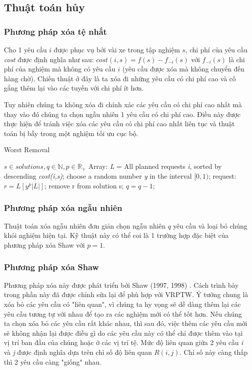 \subsection{Thuật toán hủy}

\subsubsection*{Phương pháp xóa tệ nhất}
Cho 1 yêu cầu $i$ được phục vụ bởi vài xe trong tập nghiệm $s$, chi phí của yêu cầu \textit{cost} được định nghĩa như sau: $cost(i,s)=f(s)-f_{-i}(s)$ với $f_{-i}(s)$ là chi phí của nghiệm mà không có yêu cầu $i$ (yêu cầu được xóa mà không chuyển đến hàng chờ). Chiến thuật ở đây là ta xóa đi những yêu cầu có chi phí cao và cố gắng thêm lại vào các tuyến với chi phí ít hơn.

Tuy nhiên chúng ta không xóa đi chính xác các yêu cầu có chi phí cao nhất mà thay vào đó chúng ta chọn ngẫu nhiên 1 yêu cầu có chi phí cao. Điều này được thực hiện để tránh việc xóa các yêu cầu có chi phí cao nhất liên tục và thuật toán bị bẫy trong một nghiệm tối ưu cục bộ.

\begin{algorithm}
	\label{alg:worst_removal}
	\caption{Worst Removal}
	\begin{algorithmic}[1]
		\Require $s \in {solutions}, q \in \mathbb{N}, p \in \mathbb{R}_{+}$
		\State Array: \textit{L} = All planned requests \textit{i}, sorted by descending \textit{cost(i,s)};
		\State choose a random number \textit{y} in the interval $[0, 1)$;
		\State request: $r = L\left[ y^p |L| \right]$;
		\State remove r from solution s;
		\State $q = q-1$;
		\EndWhile
	\end{algorithmic}
\end{algorithm}

\subsubsection*{Phương pháp xóa ngẫu nhiên}
Thuật toán xóa ngẫu nhiên đơn giản chọn ngẫu nhiên $q$ yêu cầu và loại bỏ chúng khỏi nghiệm hiện tại. Kỹ thuật này có thể coi là 1 trường hợp đặc biệt của phương pháp xóa Shaw với $p=1$.

\subsubsection*{Phương pháp xóa Shaw}
Phương pháp xóa này được phát triển bởi Shaw (1997, 1998) \cite{}. Cách trình bày trong phần này đã được chỉnh sửa lại để phù hợp với VRPTW. Ý tưởng chung là xóa bỏ các yêu cầu có "liên quan", vì chúng ta hy vọng sẽ dễ dàng thêm lại các yêu cầu tương tự với nhau để tạo ra các nghiệm mới có thể tốt hơn. Nếu chúng ta chọn xóa bỏ các yêu cầu rất khác nhau, thì sau đó, việc thêm các yêu cầu mới sẽ không nhận lại được điều gì do các yêu cầu này có thể chỉ được thêm vào tại vị trí ban đầu của chúng hoặc ở các vị trí tệ. Mức độ liên quan giữa 2 yêu cầu \textit{i} và \textit{j} được định nghĩa dựa trên chỉ số độ liên quan $R(i,j)$. Chỉ số này càng thấp thì 2 yêu cầu càng "giống" nhau.

